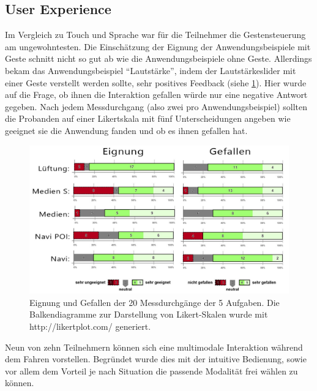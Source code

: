 \subsection[User Experience]{User Experience}
Im Vergleich zu Touch und Sprache war für die Teilnehmer die Gestensteuerung am ungewohntesten. 
Die Einschätzung der Eignung der Anwendungsbeispiele mit Geste schnitt nicht so gut ab wie die Anwendungsbeispiele ohne Geste.
Allerdings bekam das Anwendungsbeispiel "`Lautstärke"', indem der Lautstärkeslider mit einer Geste verstellt werden sollte, sehr positives Feedback (siehe \ref{fig:Smiley_Eignung_Gefallen}).
Hier wurde auf die Frage, ob ihnen die Interaktion gefallen würde nur eine negative Antwort gegeben.
Nach jedem Messdurchgang (also zwei pro Anwendungsbeispiel) sollten die Probanden auf einer Likertskala mit fünf Unterscheidungen angeben wie geeignet sie die Anwendung fanden und ob es ihnen gefallen hat.
\begin{figure}[ht]
	\centering
		\includegraphics[width=1\textwidth]{img/Smiley_Eignung_Gefallen.jpg}
	\caption[Eignung und Gefallen der 5 Aufgaben]{Eignung und Gefallen der 20 Messdurchgänge der 5 Aufgaben. Die Balkendiagramme zur Darstellung von Likert-Skalen wurde mit http://likertplot.com/ generiert.}
	\label{fig:Smiley_Eignung_Gefallen}
\end{figure}
 
Neun von zehn Teilnehmern können sich eine multimodale Interaktion während dem Fahren vorstellen.
Begründet wurde dies mit der intuitive Bedienung, sowie vor allem dem Vorteil je nach Situation die passende Modalität frei wählen zu können.

